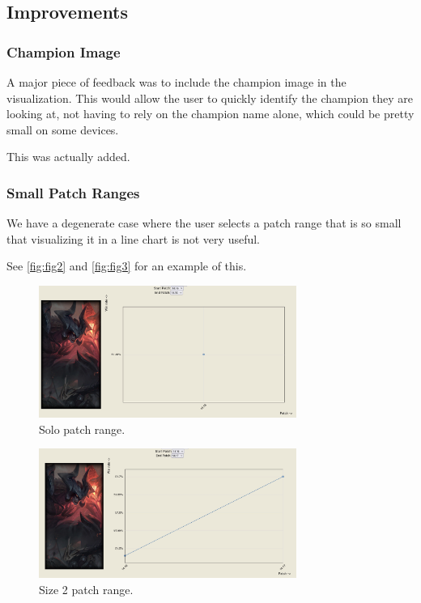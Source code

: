 \documentclass{article}
\begin{document}
\subsection{Improvements}
\label{subsec:Improvements}

\subsubsection{Champion Image}
\label{subsubsec:Champion Image}

A major piece of feedback was to include the champion image in the visualization.
This would allow the user to quickly identify the champion they are looking at,
not having to rely on the champion name alone, which could be pretty small on 
some devices.

This was actually added.

\subsubsection{Small Patch Ranges}
\label{subsubsec:Small Patch Ranges}

We have a degenerate case where the user selects a patch range that is so small
that visualizing it in a line chart is not very useful.

See \autoref{fig:fig2} and \autoref{fig:fig3} for an example of this.

\begin{figure}[ht] 
  \centering
  \includegraphics[width=0.75\textwidth]{figs/one.jpg}
  \caption{
      Solo patch range.
  }
  \label{fig:fig2}
\end{figure}

\begin{figure}[ht] 
  \centering
  \includegraphics[width=0.75\textwidth]{figs/two.jpg}
  \caption{
      Size 2 patch range.
  }
  \label{fig:fig3}
\end{figure}
\end{document}

